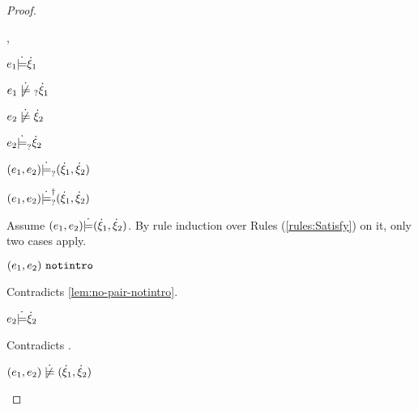 \begin{proof}
\begin{byCases}
\begin{byCases}
\begin{byCases}
        \item[\csatisfy{e_1}{\hxi_1},\cmaysatisfy{e_2}{\hxi_2}]
            \begin{pfsteps*}
            \item $e_1 \dot{\models} \dot{\xi}_1$  
            \item $\cnotmaysatisfy{e_1}{\hxi_1}$  
            \item $\cnotsatisfy{e_2}{\hxi_2}$  
            \item $e_2 \dot{\models}_{?} \dot{\xi}_2$  
            \item $(e_1 , e_2) \dot{\models}_{?} (\dot{\xi}_1 , \dot{\xi}_2)$  
            \item $(e_1 , e_2) \dot{\models}_{?}^{\dag} (\dot{\xi}_1 , \dot{\xi}_2)$ 
            \end{pfsteps*}
            Assume $(e_1 , e_2) \dot{\models} (\dot{\xi}_1 , \dot{\xi}_2)$. By rule induction over Rules (\ref{rules:Satisfy}) on it, only two cases apply. 
           \begin{byCases}
            \item[\text{(\ref{rule:CSNotIntroPair})}]
                \begin{pfsteps*}
                \item $(e_1 , e_2) ~\mathtt{notintro}$ 
                \end{pfsteps*}
                Contradicts \autoref{lem:no-pair-notintro}.
            \item[\text{(\ref{rule:CSPair})}]
                \begin{pfsteps*}
                \item $e_2 \dot{\models} \dot{\xi}_2$ 
                \end{pfsteps*}
                Contradicts .
            \end{byCases}
            \begin{pfsteps*}
            \item $\cnotsatisfy{\hpair{e_1}{e_2}}{\cpair{\hxi_1}{\hxi_2}}$ 
            \end{pfsteps*}
            

\end{byCases}
\end{byCases}
\end{byCases}
\end{proof}
